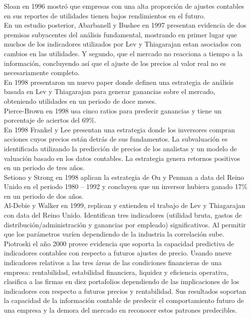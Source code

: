 Sloan \cite{Sloan1996} en 1996 mostró que empresas con una alta proporción de ajustes contables en sus reportes de utilidades tienen bajos rendimientos en el futuro.\\

En un estudio posterior, Abarbanell y Bushee \cite{Abarbanell1997} en 1997 presentan evidencia de dos premisas subyacentes del análisis fundamental, mostrando en primer lugar que muchos de los indicadores utilizados por Lev y Thiagarajan estan asociados con cambios en las utilidades. Y segundo, que el mercado no reacciona a tiempo a la información, concluyendo así que el ajuste de los precios al valor real no es necesariamente completo. \\

En 1998 presentaron un nuevo paper \cite{Abarbanell1998} donde definen una estrategia de análisis basada en Lev y Thiagarajan \cite{Lev1993} para generar ganancias sobre el mercado, obteniendo utilidades en un periodo de doce meses.\\

Pierce-Brown \cite{Pierce-Brown1998} en 1998 usa cinco ratios para predecir ganancias y tiene un porcentaje de aciertos del 69\%. \\

En 1998 Frankel y Lee \cite{Frankel1998} presentan una estrategia donde los inversores compran acciones cuyos precios están detrás de sus fundamentos. La subvaluación es identificada utilizando la predicción de precios de los analistas y un modelo de valuación basado en los datos contables. La estrategia genera retornos positivos en un periodo de tres años.\\

Setiono y Strong \cite{Setiono1998} en 1998 aplican la estrategia de Ou y Penman \cite{Ou1989} a data del Reino Unido en el periodo 1980 – 1992 y concluyen que un inversor hubiera ganado 17\% en un periodo de dos años.\\

Al-Debie y Walker \cite{Al-Debie1999} en 1999, replican y extienden el trabajo de Lev y Thiagarajan \cite{Lev1993} con data del Reino Unido. Identifican tres indicadores (utilidad bruta, gastos de distribución/administración y ganancias por empleado) significativos. Al permitir que los parámetros varíen dependiendo de la industria la correlación sube.\\

Piotroski \cite{Piotroski2000} el año 2000 provee evidencia que soporta la capacidad predictiva de indicadores contables con respecto a futuros ajustes de precio. Usando nueve indicadores relativos a las tres áreas de las condiciones financieras de una empresa: rentabilidad, estabilidad financiera, liquidez y eficiencia operativa, clasifica a las firmas en diez portafolios dependiendo de las implicaciones de los indicadores con respecto a futuros precios y rentabilidad. Sus resultados soportan la capacidad de la información contable de predecir el comportamiento futuro de una empresa y la demora del mercado en reconocer estos patrones predecibles.\\

